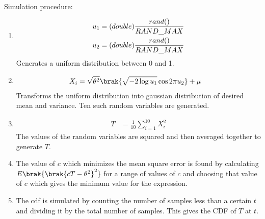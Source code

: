 \documentclass[journal,12pt,onecolumn]{IEEEtran}
\theoremstyle{remark}
\begin{document}
\\
Simulation procedure:
\begin{enumerate}[label = (\roman*)]
	\item \begin{align}
	u_1 &= (double) \frac{rand()}{RAND\_MAX} \vspace{2pt} \\
	u_2 &= (double) \frac{rand()}{RAND\_MAX}
	\end{align}
	Generates a uniform distribution between 0 and 1.
	\item \begin{align}
	 X_i &= \sqrt{\theta^2}\brak{\sqrt{-2\log{u_1}} \cos{2\pi u_2}} + \mu
	 \end{align}
	 Transforms the uniform distribution into gaussian distribution of desired mean and variance. Ten such random variables are generated.
	\item \begin{align}
	T &= \frac{1}{10}\sum^{10}_{i=1}{X_i^2}
	\end{align} 
	The values of the random variables are squared and then averaged together to generate $T$.
	\item The value of $c$ which minimizes the mean square error is found by calculating $E\brak{\brak{cT - \theta^2}^2}$ for a range of values of $c$ and choosing that value of $c$ which gives the minimum value for the expression.
	\item The cdf is simulated by counting the number of samples less than a certain $t$ and dividing it by the total number of samples. This gives the CDF of $T$ at $t$. 
\end{enumerate}
\end{document}
